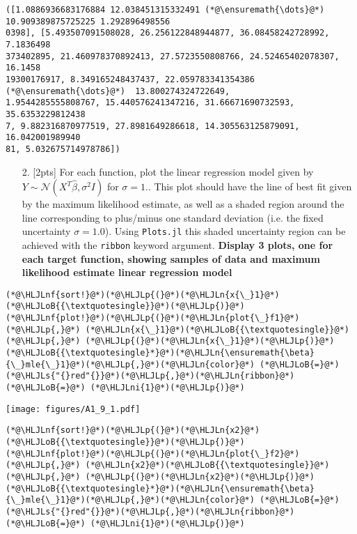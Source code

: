 \documentclass[12pt,a4paper]{article}
\newcommand{\HLJLn}[1]{#1}
\newcommand{\HLJLnf}[1]{\textcolor[RGB]{66,102,213}{#1}}
\newcommand{\HLJLs}[1]{\textcolor[RGB]{201,61,57}{#1}}
\newcommand{\HLJLni}[1]{\textcolor[RGB]{59,151,46}{#1}}
\newcommand{\HLJLoB}[1]{\textcolor[RGB]{102,102,102}{\textbf{#1}}}
\newcommand{\HLJLp}[1]{#1}
\begin{document}
\begin{lstlisting}
([1.0886936683176884 12.038451315332491 (*@\ensuremath{\dots}@*) 10.909389875725225 1.292896498556
0398], [5.493507091508028, 26.256122848944877, 36.08458242728992, 7.1836498
373402895, 21.460978370892413, 27.5723550808766, 24.52465402078307, 16.1458
19300176917, 8.349165248437437, 22.059783341354386  (*@\ensuremath{\dots}@*)  13.800274324722649, 
1.9544285555808767, 15.440576241347216, 31.66671690732593, 35.6353229812438
7, 9.882316870977519, 27.8981649286618, 14.305563125879091, 16.042001989940
81, 5.032675714978786])
\end{lstlisting}


\begin{itemize}
\item[2. ] [2pts] For each function, plot the linear regression model given by $Y \sim \mathcal{N}(X^T\hat\beta, \sigma^2 I)$ for $\sigma=1.$.  This plot should have the line of best fit given by the maximum likelihood estimate, as well as a shaded region around the line corresponding to plus/minus one standard deviation (i.e. the fixed uncertainty $\sigma=1.0$).  Using \texttt{Plots.jl} this shaded uncertainty region can be achieved with the \texttt{ribbon} keyword argument.  \textbf{Display 3 plots, one for each target function, showing samples of data and maximum likelihood estimate linear regression model}

\end{itemize}

\begin{lstlisting}
(*@\HLJLnf{sort!}@*)(*@\HLJLp{(}@*)(*@\HLJLn{x{\_}1}@*)(*@\HLJLoB{{\textquotesingle}}@*)(*@\HLJLp{)}@*)
(*@\HLJLnf{plot!}@*)(*@\HLJLp{(}@*)(*@\HLJLn{plot{\_}f1}@*)(*@\HLJLp{,}@*) (*@\HLJLn{x{\_}1}@*)(*@\HLJLoB{{\textquotesingle}}@*)(*@\HLJLp{,}@*) (*@\HLJLp{(}@*)(*@\HLJLn{x{\_}1}@*)(*@\HLJLp{)}@*)(*@\HLJLoB{{\textquotesingle}*}@*)(*@\HLJLn{\ensuremath{\beta}{\_}mle{\_}1}@*)(*@\HLJLp{,}@*)(*@\HLJLn{color}@*) (*@\HLJLoB{=}@*) (*@\HLJLs{"{}red"{}}@*)(*@\HLJLp{,}@*)(*@\HLJLn{ribbon}@*) (*@\HLJLoB{=}@*) (*@\HLJLni{1}@*)(*@\HLJLp{)}@*)
\end{lstlisting}

\texttt{[image: figures/A1\_9\_1.pdf]}

\begin{lstlisting}
(*@\HLJLnf{sort!}@*)(*@\HLJLp{(}@*)(*@\HLJLn{x2}@*)(*@\HLJLoB{{\textquotesingle}}@*)(*@\HLJLp{)}@*)
(*@\HLJLnf{plot!}@*)(*@\HLJLp{(}@*)(*@\HLJLn{plot{\_}f2}@*)(*@\HLJLp{,}@*) (*@\HLJLn{x2}@*)(*@\HLJLoB{{\textquotesingle}}@*)(*@\HLJLp{,}@*) (*@\HLJLp{(}@*)(*@\HLJLn{x2}@*)(*@\HLJLp{)}@*)(*@\HLJLoB{{\textquotesingle}*}@*)(*@\HLJLn{\ensuremath{\beta}{\_}mle{\_}1}@*)(*@\HLJLp{,}@*)(*@\HLJLn{color}@*) (*@\HLJLoB{=}@*) (*@\HLJLs{"{}red"{}}@*)(*@\HLJLp{,}@*)(*@\HLJLn{ribbon}@*) (*@\HLJLoB{=}@*) (*@\HLJLni{1}@*)(*@\HLJLp{)}@*)
\end{lstlisting}
\end{document}

